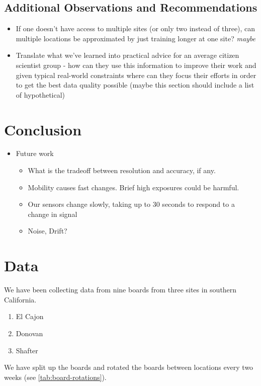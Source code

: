 \documentclass[journal abbreviation, manuscript]{copernicus}
\begin{document}
\subsection{Additional Observations and Recommendations}

\begin{itemize}
    \item If one doesn't have access to multiple sites (or only two instead of three), can multiple locations be approximated by just training longer at one site? \emph{maybe}
    \item Translate what we've learned into practical advice for an average citizen scientist group - how can they use this information to improve their work and given typical real-world constraints where can they focus their efforts in order to get the best data quality possible (maybe this section should include a list of hypothetical) 
\end{itemize}

\section{Conclusion}

\begin{itemize}
    \item Future work
    \begin{itemize}
        \item What is the tradeoff between resolution and accuracy, if any. 
        \item Mobility causes fast changes. Brief high exposures could be harmful.
        \item Our sensors change slowly, taking up to 30 seconds to respond to a change in signal
        \item Noise, Drift?
    \end{itemize}
\end{itemize}


\appendix
\setcounter{table}{0}

\section{Data}

We have been collecting data from nine boards
from three sites in southern California.
\begin{enumerate}
    \item El Cajon
    \item Donovan
    \item Shafter
\end{enumerate}
We have split up the boards and rotated the boards
between locations every two weeks (see \autoref{tab:board-rotations}).
\end{document}
